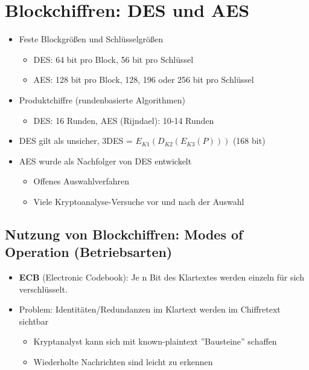 \documentclass[openany]{book}
\begin{document}
\section{Blockchiffren: DES und AES}

\begin{itemize}
    \item Feste Blockgrößen und Schlüsselgrößen
    \begin{itemize}
        \item DES: 64 bit pro Block, 56 bit pro Schlüssel
        \item AES: 128 bit pro Block, 128, 196 oder 256 bit pro Schlüssel
    \end{itemize}
    \item Produktchiffre (rundenbasierte Algorithmen)
    \begin{itemize}
        \item DES: 16 Runden, AES (Rijndael): 10-14 Runden
    \end{itemize}
    \item DES gilt als unsicher, 3DES = $E_{K1}(D_{K2}(E_{K3}(P)))$ (168 bit)
    \item AES wurde als Nachfolger von DES entwickelt
    \begin{itemize}
        \item Offenes Auswahlverfahren
        \item Viele Kryptoanalyse-Versuche vor und nach der Auswahl
    \end{itemize}
\end{itemize}

\subsection{Nutzung von Blockchiffren: Modes of Operation (Betriebsarten)}

\begin{itemize}
    \item \textbf{ECB} (Electronic Codebook): Je n Bit des Klartextes werden einzeln für sich verschlüsselt.
    \item Problem: Identitäten/Redundanzen im Klartext werden im Chiffretext sichtbar
    \begin{itemize}
        \item Kryptanalyst kann sich mit known-plaintext ''Bausteine'' schaffen
        \item Wiederholte Nachrichten sind leicht zu erkennen
    \end{itemize}
\end{itemize}
\end{document}
